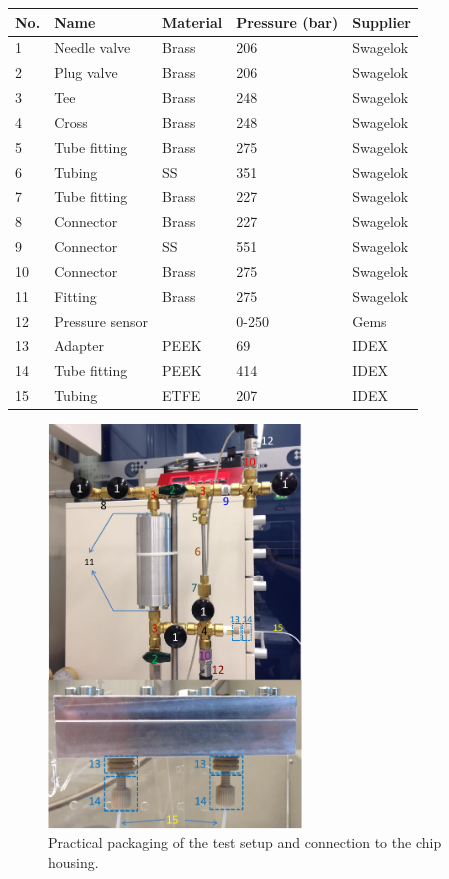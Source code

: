 \begin{table}[!h]
    \centering
    \caption{Used parts and their material and maximum working pressure}
    \begin{longtable}{l|l|l|l|l}
    \toprule
    No. & Name & Material & Pressure (bar) & Supplier \\
    \midrule
    1 & Needle valve & Brass & 206 & Swagelok \\
    2 & Plug valve & Brass & 206 & Swagelok \\
    3 & Tee & Brass & 248 & Swagelok \\
    4 & Cross & Brass & 248 & Swagelok \\
    5 & Tube fitting & Brass & 275 & Swagelok \\
    6 & Tubing & SS & 351 & Swagelok \\
    7 & Tube fitting & Brass & 227 & Swagelok \\
    8 & Connector & Brass & 227 & Swagelok \\
    9 & Connector & SS & 551 & Swagelok \\
    10 & Connector & Brass & 275 & Swagelok \\
    11 & Fitting & Brass & 275 & Swagelok \\
    12 & Pressure sensor &   & 0-250 & Gems \\
    13 & Adapter & PEEK & 69 & IDEX \\
    14 & Tube fitting & PEEK & 414 & IDEX \\
    15 & Tubing & ETFE & 207 & IDEX \\
    \bottomrule
    \end{longtable}
    \label{table4_1}
\end{table}
\clearpage

\begin{figure}[!h]%
\centering
\includegraphics[width=0.6\textwidth]{figures/packagingandtestunderhighpressure/figure4_2}%
\caption{Practical packaging of the test setup and connection to the chip housing.}%
\label{figure4_2}%
\end{figure}

